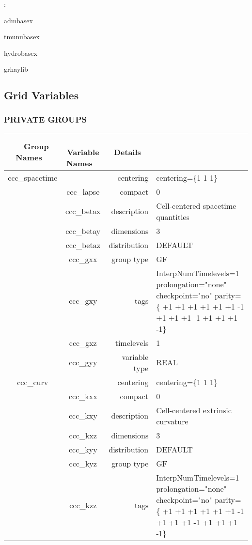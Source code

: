 \documentclass{article}
\begin{document}
: 

admbasex

tmunubasex

hydrobasex

grhaylib
\vspace{2mm}
\subsection*{Grid Variables}
\vspace{5mm}\subsubsection{PRIVATE GROUPS}

\vspace{5mm}

\begin{tabular*}{150mm}{|c|c@{\extracolsep{\fill}}|rl|} \hline 
~ {\bf Group Names} ~ & ~ {\bf Variable Names} ~  &{\bf Details} ~ & ~\\ 
\hline 
ccc\_spacetime &  & centering & centering=\{1 1 1\} \\ 
 & ccc\_lapse & compact & 0 \\ 
 & ccc\_betax & description & Cell-centered spacetime quantities \\ 
 & ccc\_betay & dimensions & 3 \\ 
 & ccc\_betaz & distribution & DEFAULT \\ 
 & ccc\_gxx & group type & GF \\ 
 & ccc\_gxy & tags & InterpNumTimelevels=1 prolongation="none" checkpoint="no" parity=\{ +1 +1 +1  +1 +1 +1  -1 +1 +1  +1 -1 +1  +1 +1 -1\} \\ 
 & ccc\_gxz & timelevels & 1 \\ 
 & ccc\_gyy & variable type & REAL \\ 
\hline 
ccc\_curv &  & centering & centering=\{1 1 1\} \\ 
 & ccc\_kxx & compact & 0 \\ 
 & ccc\_kxy & description & Cell-centered extrinsic curvature \\ 
 & ccc\_kxz & dimensions & 3 \\ 
 & ccc\_kyy & distribution & DEFAULT \\ 
 & ccc\_kyz & group type & GF \\ 
 & ccc\_kzz & tags & InterpNumTimelevels=1 prolongation="none" checkpoint="no" parity=\{ +1 +1 +1  +1 +1 +1  -1 +1 +1  +1 -1 +1  +1 +1 -1\} \\ 

\end{tabular*}
\end{document}
